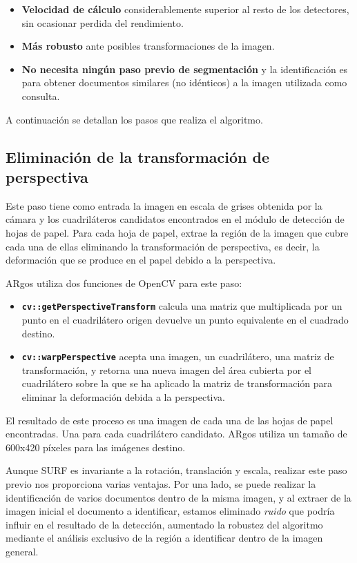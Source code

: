 \begin{itemize}
\item \textbf{Velocidad de cálculo} considerablemente superior al resto de los detectores, sin ocasionar perdida del rendimiento.
\item \textbf{Más robusto} ante posibles transformaciones de la imagen.
\item \textbf{No necesita ningún paso previo de segmentación} y la identificación es para obtener documentos similares (no
idénticos) a la imagen utilizada como consulta.
\end{itemize}

A continuación se detallan los pasos que realiza el algoritmo.

\subsection{Eliminación de la transformación de perspectiva}
Este paso tiene como entrada la imagen en escala de grises obtenida
por la cámara y los cuadriláteros candidatos encontrados en el módulo
de detección de hojas de papel. Para cada hoja de papel, extrae la
región de la imagen que cubre cada una de ellas eliminando la
transformación de perspectiva, es decir, la deformación que se produce
en el papel debido a la perspectiva.

ARgos utiliza dos funciones de OpenCV para este paso:

\begin{itemize}
\item \textbf{\texttt{cv::getPerspectiveTransform}} calcula
  una matriz que multiplicada por un punto en el cuadrilátero origen
  devuelve un punto equivalente en el cuadrado destino.

\item \textbf{\texttt{cv::warpPerspective}} acepta una
  imagen, un cuadrilátero, una matriz de transformación, y retorna una
  nueva imagen del área cubierta por el cuadrilátero sobre la que se
  ha aplicado la matriz de transformación para eliminar la deformación
  debida a la perspectiva.
\end{itemize}

El resultado de este proceso es una imagen de cada una de las hojas de
papel encontradas. Una para cada cuadrilátero candidato. ARgos utiliza
un tamaño de 600x420 píxeles para las imágenes destino.

Aunque SURF es invariante a la rotación, translación y
escala, realizar este paso previo nos proporciona varias ventajas. Por
una lado, se puede realizar la identificación de varios documentos
dentro de la misma imagen, y al extraer de la imagen inicial el
documento a identificar, estamos eliminado \emph{ruido} que podría
influir en el resultado de la detección, aumentado la robustez del algoritmo mediante
el análisis exclusivo de la región a identificar dentro de la imagen
general.

